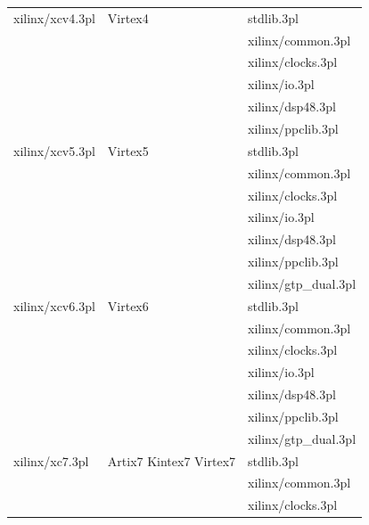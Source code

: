 \begin{tabular}{| l | l | l |}
    xilinx/xcv4.3pl  & Virtex4                         & stdlib.3pl \\
                     &                                 & xilinx/common.3pl \\
                     &                                 & xilinx/clocks.3pl \\
                     &                                 & xilinx/io.3pl \\
                     &                                 & xilinx/dsp48.3pl \\
                     &                                 & xilinx/ppclib.3pl \\ \hline
    xilinx/xcv5.3pl  & Virtex5                         & stdlib.3pl \\
                     &                                 & xilinx/common.3pl \\
                     &                                 & xilinx/clocks.3pl \\
                     &                                 & xilinx/io.3pl \\
                     &                                 & xilinx/dsp48.3pl \\
                     &                                 & xilinx/ppclib.3pl \\
                     &                                 & xilinx/gtp\_dual.3pl \\ \hline
    xilinx/xcv6.3pl  & Virtex6                         & stdlib.3pl \\
                     &                                 & xilinx/common.3pl \\
                     &                                 & xilinx/clocks.3pl \\
                     &                                 & xilinx/io.3pl \\
                     &                                 & xilinx/dsp48.3pl \\
                     &                                 & xilinx/ppclib.3pl \\
                     &                                 & xilinx/gtp\_dual.3pl \\ \hline
    xilinx/xc7.3pl   & Artix7 Kintex7 Virtex7          & stdlib.3pl \\
                     &                                 & xilinx/common.3pl \\
                     &                                 & xilinx/clocks.3pl \\

\end{tabular}
